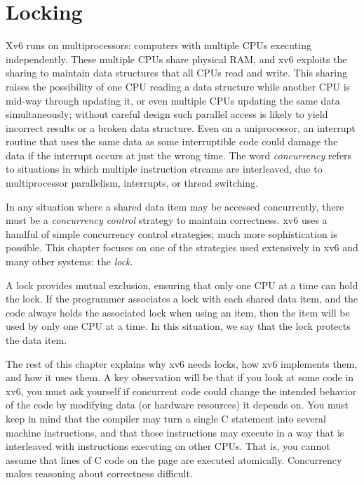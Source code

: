 \chapter{Locking}
\label{CH:LOCK}

Xv6 runs on multiprocessors: computers with
multiple CPUs executing independently.
These multiple CPUs share physical RAM,
and xv6 exploits the sharing to maintain
data structures that all CPUs read and write.
This sharing raises the possibility of
one CPU reading a data structure while another
CPU is mid-way through updating it, or even
multiple CPUs updating the same data simultaneously;
without careful design such parallel access is likely
to yield incorrect results or a broken data structure.
Even on a uniprocessor, an interrupt routine that uses
the same data as some interruptible code could damage
the data if the interrupt occurs at just the wrong time.
The word 
\textit{concurrency}
refers to situations in which
multiple instruction streams are interleaved,
due to multiprocessor parallelism, interrupts,
or thread switching.

In any situation where a shared data item may be
accessed concurrently, there must be a
\textit{concurrency control}
strategy to maintain correctness.
xv6 uses a handful of simple concurrency control
strategies; much more sophistication is possible.
This chapter focuses on one of the strategies used extensively
in xv6 and many other systems: the 
\textit{lock}.

A lock provides mutual exclusion, ensuring that only one CPU at a time can hold
the lock. If the programmer associates a lock with each shared data item,
and the code always holds the associated lock when using an item,
then the item will be used by only one CPU at a time.
In this situation, we say that the lock protects the data item.

The rest of this chapter explains why xv6 needs locks, how xv6 implements them, and how
it uses them.  A key observation will be that if you look at some code in
xv6, you must ask yourself if concurrent code could change
the intended behavior of the code by modifying data (or hardware resources)
it depends on.
You must keep in mind that the compiler may turn a
single C statement into several machine instructions,
and that those instructions may execute in a way that is
interleaved with instructions executing on other CPUs.
That is, you cannot assume that lines of C code
on the page are executed atomically.
Concurrency makes reasoning about correctness difficult.
